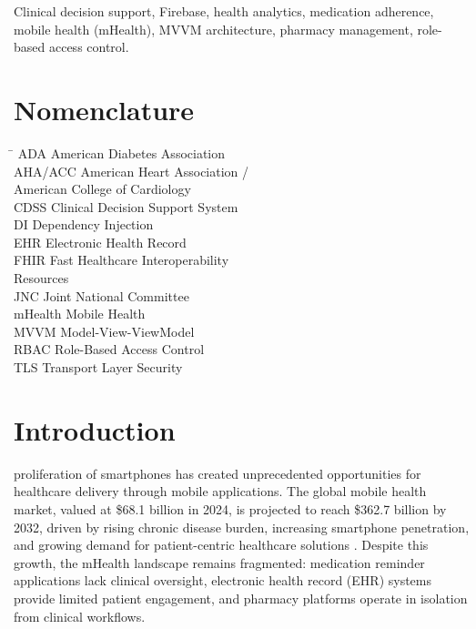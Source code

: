 \documentclass[journal,onecolumn,web]{ieeecolor}
\begin{document}
\begin{IEEEkeywords}
Clinical decision support, Firebase, health analytics,
medication adherence, mobile health (mHealth), MVVM
architecture, pharmacy management, role-based access
control.
\end{IEEEkeywords}

\section*{Nomenclature}
\begin{tabbing}
\hspace{2.5cm}\=\kill
ADA \> American Diabetes Association \\
AHA/ACC \> American Heart Association / \\
\> American College of Cardiology \\
CDSS \> Clinical Decision Support System \\
DI \> Dependency Injection \\
EHR \> Electronic Health Record \\
FHIR \> Fast Healthcare Interoperability \\
\> Resources \\
JNC \> Joint National Committee \\
mHealth \> Mobile Health \\
MVVM \> Model-View-ViewModel \\
RBAC \> Role-Based Access Control \\
TLS \> Transport Layer Security
\end{tabbing}

\section{Introduction}
\label{sec:introduction}
 proliferation of smartphones has created unprecedented opportunities for healthcare delivery through mobile applications. The global mobile health market, valued at \$68.1 billion in 2024, is projected to reach \$362.7 billion by 2032, driven by rising chronic disease burden, increasing smartphone penetration, and growing demand for patient-centric healthcare solutions \cite{grandview2024}. Despite this growth, the mHealth landscape remains fragmented: medication reminder applications lack clinical oversight, electronic health record (EHR) systems provide limited patient engagement, and pharmacy platforms operate in isolation from clinical workflows.
\end{document}
